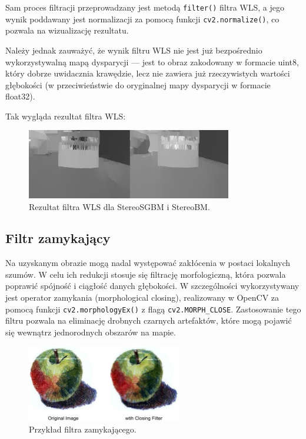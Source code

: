 \documentclass[magisterska]{pracadypl}
\begin{document}
Sam proces filtracji przeprowadzany jest metodą \texttt{filter()} filtra WLS, a jego wynik poddawany jest normalizacji za pomocą funkcji \texttt{cv2.normalize()}, co pozwala na wizualizację rezultatu.

Należy jednak zauważyć, że wynik filtru WLS nie jest już bezpośrednio wykorzystywalną mapą dysparycji — jest to obraz zakodowany w formacie uint8, który dobrze uwidacznia krawędzie, lecz nie zawiera już rzeczywistych wartości głębokości (w przeciwieństwie do oryginalnej mapy dysparycji w formacie float32).

Tak wygląda rezultat filtra WLS:

\begin{figure}[H]  %
    \centering  %
    \includegraphics[width=0.8\textwidth]{images/combinedWLS.png}  %
    \captionsetup{font=footnotesize}
    \caption[Rezultat filtra WLS dla StereoSGBM i StereoBM. Opracowanie własne.]{Rezultat filtra WLS dla StereoSGBM i StereoBM.}
\end{figure}

\subsection{Filtr zamykający}

Na uzyskanym obrazie mogą nadal występować zakłócenia w postaci lokalnych szumów. W celu ich redukcji stosuje się filtrację morfologiczną, która pozwala poprawić spójność i ciągłość danych głębokości. W szczególności wykorzystywany jest operator zamykania (morphological closing), realizowany w OpenCV za pomocą funkcji \texttt{cv2.morphologyEx()} z flagą \texttt{cv2.MORPH\_CLOSE}. Zastosowanie tego filtru pozwala na eliminację drobnych czarnych artefaktów, które mogą pojawić się wewnątrz jednorodnych obszarów na mapie.

\begin{figure}[H]  %
    \centering  %
    \includegraphics[width=0.6\textwidth]{images/closeF.png}  %
    \captionsetup{font=footnotesize}
    \caption[Przykład filtra zamykającego. https://www.graphicsmill.com/docs/gm/minimum-maximum-median-filters.htm]{Przykład filtra zamykającego.}
\end{figure}
\end{document}
